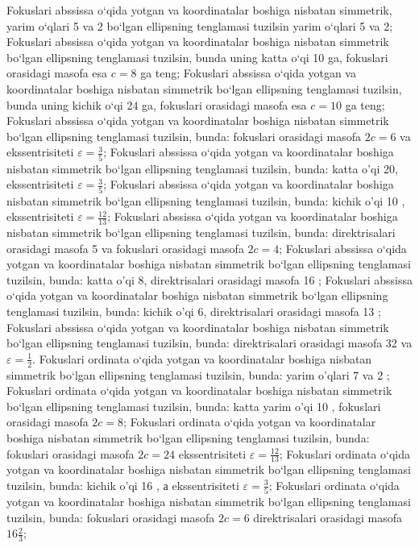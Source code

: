 Fokuslari abssissa o‘qida yotgan va koordinatalar boshiga nisbatan simmetrik, yarim o‘qlari 5 va 2 bo‘lgan ellipsning tenglamasi tuzilsin yarim o‘qlari 5 va 2;
Fokuslari abssissa o‘qida yotgan va koordinatalar boshiga nisbatan simmetrik bo‘lgan ellipsning tenglamasi tuzilsin, bunda uning katta o‘qi 10 ga, fokuslari orasidagi masofa esa $c = 8$ ga teng;
Fokuslari abssissa o‘qida yotgan va koordinatalar boshiga nisbatan simmetrik bo‘lgan ellipsning tenglamasi tuzilsin, bunda uning kichik o‘qi 24 ga, fokuslari orasidagi masofa esa $c = 10$ ga teng;
Fokuslari abssissa o‘qida yotgan va koordinatalar boshiga nisbatan simmetrik bo‘lgan ellipsning tenglamasi tuzilsin, bunda: fokuslari orasidagi masofa $2 c=6$ va ekssentrisiteti $\varepsilon=\frac{3}{5}$;
Fokuslari abssissa o‘qida yotgan va koordinatalar boshiga nisbatan simmetrik bo‘lgan ellipsning tenglamasi tuzilsin, bunda: katta o'qi 20, ekssentrisiteti $\varepsilon=\frac{3}{5}$;
Fokuslari abssissa o‘qida yotgan va koordinatalar boshiga nisbatan simmetrik bo‘lgan ellipsning tenglamasi tuzilsin, bunda: kichik o'qi 10 , ekssentrisiteti $\varepsilon=\frac{12}{13}$;
Fokuslari abssissa o‘qida yotgan va koordinatalar boshiga nisbatan simmetrik bo‘lgan ellipsning tenglamasi tuzilsin, bunda: direktrisalari orasidagi masofa 5 va fokuslari orasidagi masofa $2 c=4$;
Fokuslari abssissa o‘qida yotgan va koordinatalar boshiga nisbatan simmetrik bo‘lgan ellipsning tenglamasi tuzilsin, bunda: katta o'qi 8, direktrisalari orasidagi masofa 16 ;
Fokuslari abssissa o‘qida yotgan va koordinatalar boshiga nisbatan simmetrik bo‘lgan ellipsning tenglamasi tuzilsin, bunda: kichik o'qi 6, direktrisalari orasidagi masofa 13 ;
Fokuslari abssissa o‘qida yotgan va koordinatalar boshiga nisbatan simmetrik bo‘lgan ellipsning tenglamasi tuzilsin, bunda: direktrisalari orasidagi masofa 32 va $\varepsilon=\frac{1}{2}$.
Fokuslari ordinata o‘qida yotgan va koordinatalar boshiga nisbatan simmetrik bo‘lgan ellipsning tenglamasi tuzilsin, bunda: yarim o'qlari 7 va 2 ;
Fokuslari ordinata o‘qida yotgan va koordinatalar boshiga nisbatan simmetrik bo‘lgan ellipsning tenglamasi tuzilsin, bunda: katta yarim o'qi 10 , fokuslari orasidagi masofa $2 c=8$;
Fokuslari ordinata o‘qida yotgan va koordinatalar boshiga nisbatan simmetrik bo‘lgan ellipsning tenglamasi tuzilsin, bunda: fokuslari orasidagi masofa $2 c=24$ ekssentrisiteti $\varepsilon=\frac{12}{13}$;
Fokuslari ordinata o‘qida yotgan va koordinatalar boshiga nisbatan simmetrik bo‘lgan ellipsning tenglamasi tuzilsin, bunda: kichik o'qi 16 , а ekssentrisiteti $\varepsilon=\frac{3}{5}$;
Fokuslari ordinata o‘qida yotgan va koordinatalar boshiga nisbatan simmetrik bo‘lgan ellipsning tenglamasi tuzilsin, bunda: fokuslari orasidagi masofa $2 c=6$ direktrisalari orasidagi masofa $16 \frac{2}{3}$;
